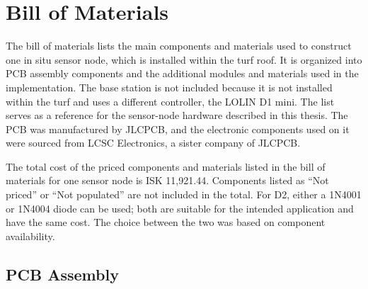 
\section{\texorpdfstring{Bill of Materials}{Bill of Materials}}

The bill of materials lists the main components and materials used to construct one in situ sensor node, which is installed within the turf roof. It is organized into PCB assembly components and the additional modules and materials used in the implementation. The base station is not included because it is not installed within the turf and uses a different controller, the LOLIN D1 mini. The list serves as a reference for the sensor-node hardware described in this thesis. The PCB was manufactured by JLCPCB, and the electronic components used on it were sourced from LCSC Electronics, a sister company of JLCPCB.

The total cost of the priced components and materials listed in the bill of materials for one sensor node is ISK 11,921.44. Components listed as ``Not priced'' or ``Not populated'' are not included in the total. For D2, either a 1N4001 or 1N4004 diode can be used; both are suitable for the intended application and have the same cost. The choice between the two was based on component availability.

\subsection{\texorpdfstring{PCB Assembly}{PCB Assembly}}

\begingroup
\small


